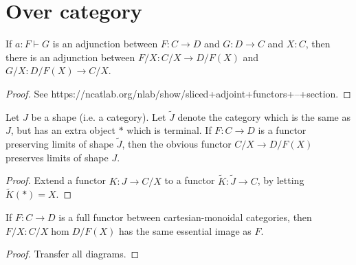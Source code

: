 \section{Over category}


\begin{proposition}
  \label{0-slice-adj}
  \leanok
  \mathlibok

  If $a : F \vdash G$ is an adjunction between $F : C \to D$ and $G : D \to C$ and $X : C$, then there is an adjunction between $F / X : C / X \to D / F(X)$ and $G / X : D / F(X) \to C / X$.
\end{proposition}
\begin{proof}
  \leanok

  See https://ncatlab.org/nlab/show/sliced+adjoint+functors+--+section.
\end{proof}


\begin{proposition}
  \label{0-over-lim}
  \leanok

  Let $J$ be a shape (i.e. a category). Let $\widetilde J$ denote the category which is the same as $J$, but has an extra object $*$ which is terminal.
  If $F : C \to D$ is a functor preserving limits of shape $\widetilde J$, then the obvious functor $C / X \to D / F(X)$ preserves limits of shape $J$.
\end{proposition}
\begin{proof}
  \leanok

  Extend a functor $K\colon  J \to C / X$ to a functor $\widetilde K\colon \widetilde J \to C$, by letting $\widetilde K (*) = X$.
\end{proof}


\begin{proposition}
  \label{0-ess-image-over}
  \leanok

  If $F : C \to D$ is a full functor between cartesian-monoidal categories, then $F / X : C / X \hom D / F(X)$ has the same essential image as $F$.
\end{proposition}
\begin{proof}
  \leanok

  Transfer all diagrams.
\end{proof}
